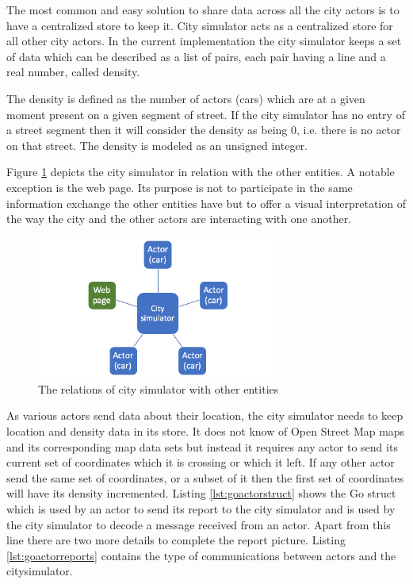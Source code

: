 \documentclass[conference]{IEEEtran}
\begin{document}
The most common and easy solution to share data across all the city actors is to have a centralized store to keep it. City simulator acts as a centralized store for all other city actors. In the current implementation the city simulator keeps a set of data which can be described as a list of pairs, each pair having a line and a real number, called density.

The density is defined as the number of actors (cars) which are at a given moment present on a given segment of street. If the city simulator has no entry of a street segment then it will consider the density as being 0, i.e. there is no actor on that street. The density is modeled as an unsigned integer.

Figure \ref{fig:citysimrelations} depicts the city simulator in relation with the other entities. A notable exception is the web page. Its purpose is not to participate in the same information exchange the other entities have but to offer a visual interpretation of the way the city and the other actors are interacting with one another.

\begin{figure}
    \includegraphics[width=8cm]{CitySimulator.png}
    \centering
    \caption{The relations of city simulator with other entities}
    \label{fig:citysimrelations}
\end{figure}

As various actors send data about their location, the city simulator needs to keep location and density data in its store. It does not know of Open Street Map maps and its corresponding map data sets but instead it requires any actor to send its current set of coordinates which it is crossing or which it left. If any other actor send the same set of coordinates, or a subset of it then the first set of coordinates will have its density incremented. Listing \ref{lst:goactorstruct} shows the Go struct which is used by an actor to send its report to the city simulator and is used by the city simulator to decode a message received from an actor. Apart from this line there are two more details to complete the report picture. Listing \ref{lst:goactorreports} contains the type of communications between actors and the citysimulator.
\end{document}
